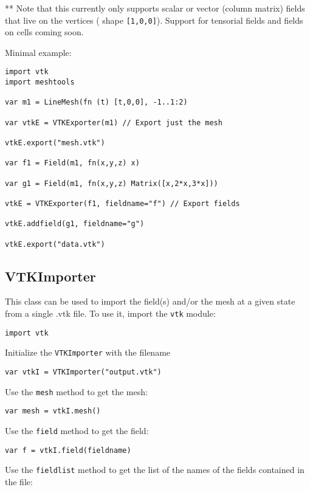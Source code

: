 ** Note that this currently only supports scalar or vector (column
matrix) fields that live on the vertices ( shape \texttt{{[}1,0,0{]}}).
Support for tensorial fields and fields on cells coming soon.

Minimal example:

\begin{lstlisting}
import vtk
import meshtools

var m1 = LineMesh(fn (t) [t,0,0], -1..1:2)

var vtkE = VTKExporter(m1) // Export just the mesh 

vtkE.export("mesh.vtk")

var f1 = Field(m1, fn(x,y,z) x)

var g1 = Field(m1, fn(x,y,z) Matrix([x,2*x,3*x]))

vtkE = VTKExporter(f1, fieldname="f") // Export fields

vtkE.addfield(g1, fieldname="g")

vtkE.export("data.vtk")
\end{lstlisting}

\hypertarget{vtkimporter}{%
\subsection{VTKImporter}\label{vtkimporter}}

This class can be used to import the field(s) and/or the mesh at a given
state from a single .vtk file. To use it, import the \texttt{vtk}
module:

\begin{lstlisting}
import vtk
\end{lstlisting}

Initialize the \texttt{VTKImporter} with the filename

\begin{lstlisting}
var vtkI = VTKImporter("output.vtk")
\end{lstlisting}

Use the \texttt{mesh} method to get the mesh:

\begin{lstlisting}
var mesh = vtkI.mesh()
\end{lstlisting}

Use the \texttt{field} method to get the field:

\begin{lstlisting}
var f = vtkI.field(fieldname)
\end{lstlisting}

Use the \texttt{fieldlist} method to get the list of the names of the
fields contained in the file:

